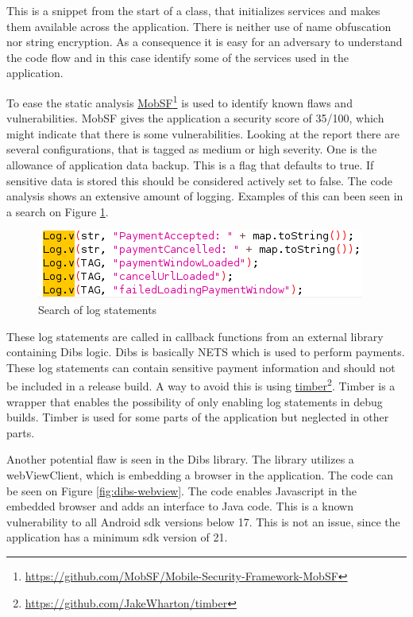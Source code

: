 This is a snippet from the start of a class, that initializes services and makes them available across the application. There is neither use of name obfuscation nor string encryption. As a consequence it is easy for an adversary to understand the code flow and in this case identify some of the services used in the application.

To ease the static analysis \href{https://github.com/MobSF/Mobile-Security-Framework-MobSF}{MobSF}\footnote{\href{https://github.com/MobSF/Mobile-Security-Framework-MobSF}{https://github.com/MobSF/Mobile-Security-Framework-MobSF}} is used to identify known flaws and vulnerabilities. MobSF gives the application a security score of 35/100, which might indicate that there is some vulnerabilities. Looking at the report there are several configurations, that is tagged as medium or high severity. One is the allowance of application data backup. This is a flag that defaults to true. If sensitive data is stored this should be considered actively set to false. The code analysis shows an extensive amount of logging. Examples of this can been seen in a search on Figure \ref{fig:log-payments}.

\begin{figure}[htbp]
    \centering
    \includegraphics[width=1\columnwidth]{../static-analysis/pictures/log_payments.png}
    \caption{Search of log statements}
    \label{fig:log-payments}
\end{figure}

These log statements are called in callback functions from an external library containing Dibs logic. Dibs is basically NETS which is used to perform payments. These log statements can contain sensitive payment information and should not be included in a release build. A way to avoid this is using \href{https://github.com/JakeWharton/timber}{timber}\footnote{\href{https://github.com/JakeWharton/timber}{https://github.com/JakeWharton/timber}}. Timber is a wrapper that enables the possibility of only enabling log statements in debug builds. Timber is used for some parts of the application but neglected in other parts.    

Another potential flaw is seen in the Dibs library. The library utilizes a webViewClient, which is embedding a browser in the application. The code can be seen on Figure \ref{fig:dibs-webview}. The code enables Javascript in the embedded browser and adds an interface to Java code. This is a known vulnerability to all Android sdk versions below 17\cite{avg-webview-explot}. This is not an issue, since the application has a minimum sdk version of 21.    

